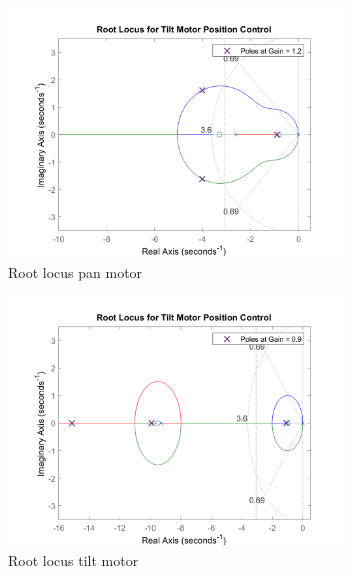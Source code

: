 \documentclass[../../main.tex]{subfiles}
\begin{document}
\begin{figure}[h]
\begin{subfigure}{0.48\textwidth}
    \includegraphics[width = 0.97\textwidth]{Sections/System_Design/Images/RL_PanMotorPos2.png}
    \caption{Root locus pan motor}
    \label{fig:PosRootLocusPan}
\end{subfigure}\quad
\begin{subfigure}{0.48\textwidth}
    \includegraphics[width = 0.97\textwidth]{Sections/System_Design/Images/RL_TiltMotorPos.png}
    \caption{Root locus tilt motor}
    \label{fig:PosRootLocusTilt}
\end{subfigure}
\caption{}
\label{fig:PosRootLocus}
\end{figure}
\end{document}
